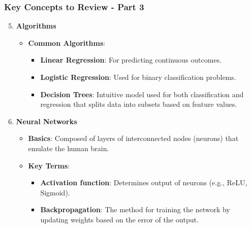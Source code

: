 \documentclass[aspectratio=169]{beamer}
\begin{document}
\begin{frame}[fragile]
    \frametitle{Key Concepts to Review - Part 3}
    \begin{enumerate}
        \setcounter{enumi}{4}  %
        \item \textbf{Algorithms}
            \begin{itemize}
                \item \textbf{Common Algorithms}:
                    \begin{itemize}
                        \item \textbf{Linear Regression}: For predicting continuous outcomes.
                        \item \textbf{Logistic Regression}: Used for binary classification problems.
                        \item \textbf{Decision Trees}: Intuitive model used for both classification and regression that splits data into subsets based on feature values.
                    \end{itemize}
            \end{itemize}
        \item \textbf{Neural Networks}
            \begin{itemize}
                \item \textbf{Basics}: Composed of layers of interconnected nodes (neurons) that emulate the human brain.
                \item \textbf{Key Terms}:
                    \begin{itemize}
                        \item \textbf{Activation function}: Determines output of neurons (e.g., ReLU, Sigmoid).
                        \item \textbf{Backpropagation}: The method for training the network by updating weights based on the error of the output.
                    \end{itemize}
            \end{itemize}
    \end{enumerate}
\end{frame}
\end{document}

